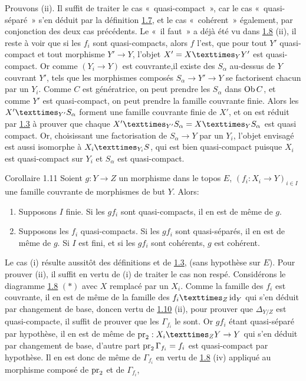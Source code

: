 \documentclass[10pt]{../fichiers-configuration-latex/smfart}
\begin{document}
Prouvons (ii). Il suffit de traiter le cas « quasi-compact », car
le cas « quasi-séparé » s'en déduit par la définition \hyperref[VI.def1.7]{1.7}, et le
cas « cohérent » également, par conjonction des deux cas
précédents. Le « il faut » a déjà été vu dans \hyperref[VI.prop1.8]{1.8} (ii), il reste à
voir que si les $f_i$ sont quasi-compacts, alors $f$ l'est, \ie que
pour tout $Y'$ quasi-compact et tout morphisme $Y'\to Y$, l'objet $X'=
\fprod{X}{Y'}{Y}$ est quasi-compact. Or comme $(Y_i \to Y)$ est
couvrante,\pageoriginale il existe des $S_{\alpha}$ au-dessus de $Y$
couvrant $Y'$, tels que les morphismes composés $S_{\alpha}\to Y'\to
Y$ se factorisent chacun par un $Y_{i}$. Comme $C$ est génératrice, on
peut prendre les $S_{\alpha}$ dans $\operatorname{Ob} C$, et
comme $Y'$ est
quasi-compact, on peut prendre la famille couvrante finie. Alors les
$\fprod{X'}{S_{\alpha}}{Y'}$ forment une famille couvrante finie de
$X'$, et on est réduit par \hyperref[VI.prop1.3]{1.3} à prouver que chaque
$\fprod{X'}{S_{\alpha}}{Y'} = \fprod{X}{S_{\alpha}}{Y}$ est quasi
compact. Or, choisissant une factorisation de $S_{\alpha} \to Y$ par
un $Y_i$, l'objet envisagé est aussi isomorphe à
$\fprod{X_i}{S}{Y_i}$, qui est bien quasi-compact puisque $X_i$ est
quasi-compact sur $Y_i$ et $S_{\alpha}$ est quasi-compact.

\begin{enonce*}{Corollaire 1.11}
Soient $g : Y \to Z$ un morphisme dans le topos $E$, $(f_i : X_i \to
Y)_{i \in I}$ une famille couvrante de morphismes de but $Y$. Alors:
\begin{enumerate}
\renewcommand{\theenumi}{\roman{enumi}}
\renewcommand{\labelenumi}{(\theenumi)}
\item Supposons $I$ finie. Si les $gf_i$ sont quasi-compacts, il en
  est de même de $g$.

\item Supposons les $f_i$ quasi-compacts. Si les $gf_i$ sont
  quasi-séparés, il en est de même de $g$. Si $I$ est fini, et si les
  $gf_i$ sont cohérents, $g$ est cohérent.
\end{enumerate}
\end{enonce*}

Le cas (i) résulte aussitôt des définitions et de \hyperref[VI.prop1.3]{1.3},
(sans hypothèse sur $E$). Pour prouver (ii), il suffit en vertu de
(i) de traiter le cas non respé. Considérons le diagramme
\hyperref[VI.prop1.8]{1.8} $(\ast)$ avec $X$ remplacé par un $X_i$. Comme la
famille des $f_i$ est couvrante, il en est de même de la famille des
$\fprod{f_i}{\id_Y}{Z}$ qui s'en déduit par changement de base,
donc\pageoriginale en vertu de \hyperref[VI.prop1.10]{1.10} (ii), pour prouver
que $\Delta_{Y /Z}$ est quasi-compacte, il suffit de prouver que les
$\Gamma_{f_i}$ le sont. Or $gf_i$ étant quasi-séparé par hypothèse,
il en est de même de $\pr_2 : \fprod{X_i}{Y}{Z} \to Y$ qui s'en
déduit par changement de base, d'autre part $\operatorname{pr}_2 \Gamma_{f_i} =
f_i$ est quasi-compact par hypothèse. Il en est donc de même de
$\Gamma_{f_i}$ en vertu de \hyperref[VI.prop1.8]{1.8} (iv) appliqué au
morphisme composé de $\operatorname{pr}_2$ et de $\Gamma_{f_i}$, \cqfd
\end{document}
